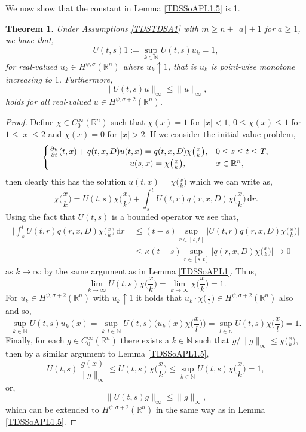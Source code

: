 \documentclass[a4paper, 12pt]{report}
\newtheorem{theorem}{Theorem}[section]
\theoremstyle{cor}
\theoremstyle{remark}
\theoremstyle{definition}
\begin{document}
We now show that the constant in Lemma \ref{TDSSoAPL1.5} is 1.
\begin{theorem}
Under Assumptions \ref{TDSTDSA1} with $m \ge n + \lfloor a \rfloor + 1$ for $a \ge 1$, we have that,
\begin{equation}
U(t, s)1 := \sup_{k \in \mathbb{N}}U(t, s)u_k = 1,
\end{equation}
for real-valued $u_k \in H^{\psi, \sigma}(\mathbb{R}^n)$ where $u_k \uparrow 1$, that is $u_k$ is point-wise monotone increasing to $1$.  Furthermore,
\begin{equation}\label{UBiSN}
\|U(t, s)u\|_\infty \le \|u\|_\infty,
\end{equation}
holds for all real-valued $u \in H^{\psi, \sigma + 2}(\mathbb{R}^n)$.
\end{theorem}
\begin{proof}
Define $\chi \in C_0^\infty(\mathbb{R}^n)$ such that $\chi(x) = 1$ for $|x| < 1$, $0 \le \chi(x) \le 1$ for $1 \le |x| \le 2$ and $\chi(x) = 0$ for $|x| > 2$.  If we consider the initial value problem,
$$
\begin{cases}
\frac{\partial u}{\partial t}(t, x) + q(t, x, D)u(t, x) = q(t, x, D)\chi\big(\frac{x}{k}\big), & 0 \le s \le t \le T,\\
\hspace{3.4cm} u(s, x) = \chi\big(\frac{x}{k}\big), & x \in \mathbb{R}^n,
\end{cases}
$$
then clearly this has the solution $u(t, x) = \chi\big(\frac{x}{k}\big)$ which we can write as,
$$
\chi\Big(\frac{x}{k}\Big) = U(t, s)\chi\Big(\frac{x}{k}\Big) + \int_s^tU(t, r)q(r, x, D)\chi\Big(\frac{x}{k}\Big)\,\mathrm{d}r.
$$
Using the fact that $U(t, s)$ is a bounded operator we see that,
$$
\begin{aligned}
\bigg|\int_s^tU(t, r)q(r, x, D)\chi\Big(\frac{x}{k}\Big)\,\mathrm{d}r\bigg| & \le (t - s)\sup_{r \in [s, t]}\Big|U(t, r)q(r, x, D)\chi\Big(\frac{x}{k}\Big)\Big|\\
& \le \kappa(t - s)\sup_{r \in [s, t]}\Big|q(r, x, D)\chi\Big(\frac{x}{k}\Big)\Big| \to 0
\end{aligned}
$$
as $k \to \infty$ by the same argument as in Lemma \ref{TDSSoAPL1}.  Thus,
$$
\lim_{k \to \infty}U(t, s)\chi\Big(\frac{x}{k}\Big) = \lim_{k \to \infty}\chi\Big(\frac{x}{k}\Big) = 1.
$$
For $u_k \in H^{\psi, \sigma + 2}(\mathbb{R}^n)$ with $u_k \uparrow 1$ it holds that $u_k \cdot \chi\big(\frac{\cdot}{l}\big) \in H^{\psi, \sigma + 2}(\mathbb{R}^n)$ also and so,
$$
\sup_{k \in \mathbb{N}}U(t, s)u_k(x) = \sup_{k, l \in \mathbb{N}}U(t, s)\bigg(u_k(x)\chi\Big(\frac{x}{l}\Big)\bigg) = \sup_{l \in \mathbb{N}}U(t, s)\chi\Big(\frac{x}{l}\Big) = 1.
$$
Finally, for each $g \in C_0^\infty(\mathbb{R}^n)$ there exists a $k \in \mathbb{N}$ such that $g/\|g\|_\infty \le \chi\big(\frac{x}{k}\big)$, then by a similar argument to Lemma \ref{TDSSoAPL1.5},
$$
U(t, s)\frac{g(x)}{\|g\|_\infty} \le U(t, s)\chi\Big(\frac{x}{k}\Big) \le \sup_{k \in \mathbb{N}}U(t, s)\chi\Big(\frac{x}{k}\Big) = 1,
$$
or,
$$
\|U(t, s)g\|_\infty \le \|g\|_\infty,
$$
which can be extended to $H^{\psi, \sigma + 2}(\mathbb{R}^n)$ in the same way as in Lemma \ref{TDSSoAPL1.5}.
\end{proof}
\end{document}
